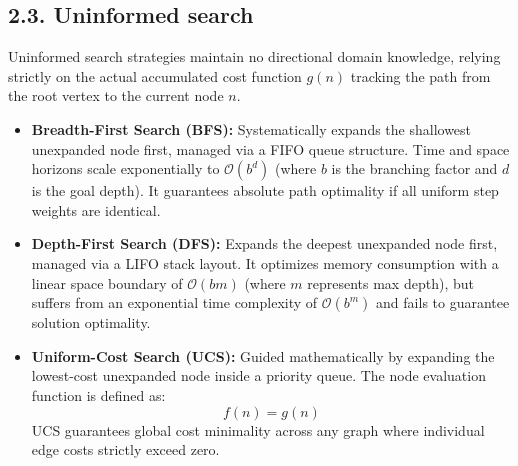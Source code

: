 \documentclass[11pt,a4paper]{article}
\begin{document}
\subsection{2.3. Uninformed search}
Uninformed search strategies maintain no directional domain knowledge, relying strictly on the actual accumulated cost function $g(n)$ tracking the path from the root vertex to the current node $n$.
\begin{itemize}
    \item \textbf{Breadth-First Search (BFS):} Systematically expands the shallowest unexpanded node first, managed via a FIFO queue structure. Time and space horizons scale exponentially to $\mathcal{O}(b^d)$ (where $b$ is the branching factor and $d$ is the goal depth). It guarantees absolute path optimality if all uniform step weights are identical.
    \item \textbf{Depth-First Search (DFS):} Expands the deepest unexpanded node first, managed via a LIFO stack layout. It optimizes memory consumption with a linear space boundary of $\mathcal{O}(bm)$ (where $m$ represents max depth), but suffers from an exponential time complexity of $\mathcal{O}(b^m)$ and fails to guarantee solution optimality.
    \item \textbf{Uniform-Cost Search (UCS):} Guided mathematically by expanding the lowest-cost unexpanded node inside a priority queue. The node evaluation function is defined as:
    \begin{equation}
        f(n) = g(n)
    \end{equation}
    UCS guarantees global cost minimality across any graph where individual edge costs strictly exceed zero.
\end{itemize}
\end{document}
